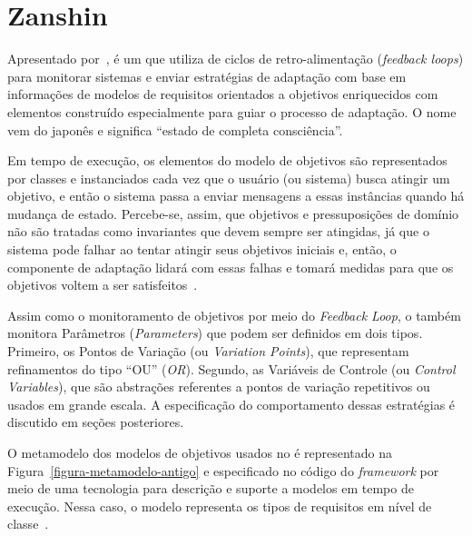 
\section{Zanshin}
\label{sec-referencial-zanshin}

Apresentado por~, \zanshin é um \framework que utiliza de ciclos de retro-alimentação (\textit{feedback loops}) para monitorar sistemas e enviar estratégias de adaptação com base em informações de modelos de requisitos orientados a objetivos enriquecidos com elementos construído especialmente para guiar o processo de adaptação. O nome \zanshin vem do japonês e significa ``estado de completa consciência''.

Em tempo de execução, os elementos do modelo de objetivos são representados por classes e instanciados cada vez que o usuário (ou sistema) busca atingir um objetivo, e então o sistema passa a enviar mensagens a essas instâncias quando há mudança de estado. Percebe-se, assim, que objetivos e pressuposições de domínio não são tratadas como invariantes que devem sempre ser atingidas, já que o sistema pode falhar ao tentar atingir seus objetivos iniciais e, então, o componente de adaptação lidará com essas falhas e tomará medidas para que os objetivos voltem a ser satisfeitos~\cite{souza2013requirements}.

Assim como o monitoramento de objetivos por meio do \textit{Feedback Loop}, o \zanshin também monitora Parâmetros (\textit{Parameters}) que podem ser definidos em dois tipos. Primeiro, os Pontos de Variação (ou \textit{Variation Points}), que representam refinamentos do tipo ``OU'' (\textit{OR}). Segundo, as Variáveis de Controle (ou \textit{Control Variables}), que são abstrações referentes a pontos de variação repetitivos ou usados em grande escala. A especificação do comportamento dessas estratégias é discutido em seções posteriores.

O metamodelo dos modelos de objetivos usados no \zanshin é representado na Figura~\ref{figura-metamodelo-antigo} e especificado no código do \textit{framework} por meio	 de uma tecnologia \ecore para descrição e suporte a modelos em tempo de execução. Nessa caso, o modelo representa os tipos de requisitos em nível de classe~\cite{souza2013requirements}.

